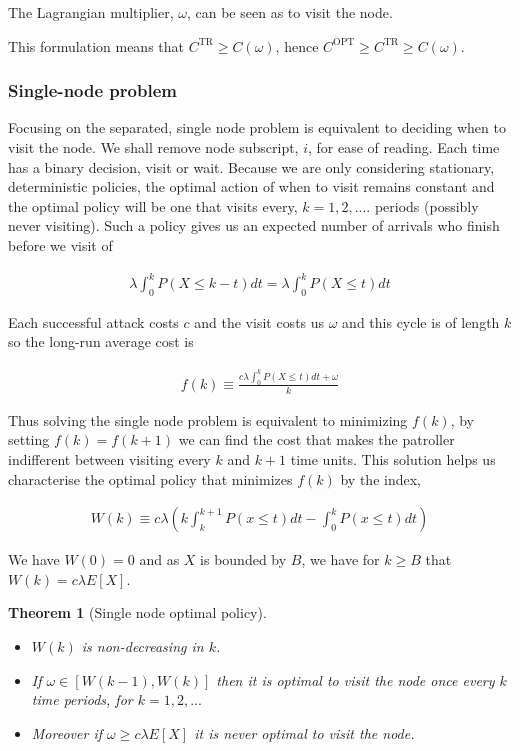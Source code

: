 \documentclass[a4paper,10pt]{article}
\newtheorem{theorem}{Theorem}[section]
\theoremstyle{definition}
\theoremstyle{definition}
\theoremstyle{remark}
\theoremstyle{definition}
\begin{document}
The Lagrangian multiplier, $\omega$, can be seen as  to visit the node.

This formulation means that $C^{\text{TR}} \geq C(\omega)$, hence $C^{\text{OPT}} \geq C^{\text{TR}} \geq C(\omega)$.

\subsubsection{Single-node problem}

Focusing on the separated, single node problem is equivalent to deciding when to visit the node. We shall remove node subscript, $i$, for ease of reading. Each time has a binary decision, visit or wait. Because we are only considering stationary, deterministic policies, the optimal action of when to visit remains constant and the optimal policy will be one that visits every, $k=1,2,....$ periods (possibly never visiting). Such a policy gives us an expected number of arrivals who finish before we visit of

\begin{align*}
\lambda \int_{0}^{k} P(X \leq k-t) dt= \lambda \int_{0}^{k} P(X \leq t) dt
\end{align*}

Each successful attack costs $c$ and the visit costs us $\omega$ and this cycle is of length $k$ so the long-run average cost is

\begin{align*}
f(k) \equiv \frac{c \lambda \int_{0}^{k} P(X \leq t) dt + \omega}{k}
\end{align*}

Thus solving the single node problem is equivalent to minimizing $f(k)$, by setting $f(k) = f(k+1)$ we can find the cost that makes the patroller indifferent between visiting every $k$ and $k+1$ time units. This solution helps us characterise the optimal policy that minimizes $f(k)$ by the index,

\begin{align*}
W(k) \equiv c \lambda \left( k \int_{k}^{k+1} P(x \leq t) dt - \int_{0}^{k} P(x \leq t) dt \right)
\end{align*}

We have $W(0)=0$ and as $X$ is bounded by $B$, we have for $k \geq B$ that $W(k)= c \lambda E[X]$.

\begin{theorem}[Single node optimal policy]
\label{Theorem:Single node optimal policy}
\begin{itemize}
\item[a)] $W(k)$ is non-decreasing in $k$.
\item[b)] If $\omega \in [W(k-1),W(k)]$ then it is optimal to visit the node once every $k$ time periods, for $k=1,2,...$
\item[c)] Moreover if $\omega \geq c \lambda E[X]$ it is never optimal to visit the node.
\end{itemize}
\end{theorem}
\end{document}
